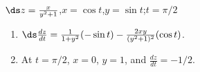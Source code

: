 {$\ds z=\frac{x}{y^2+1}$,\qquad $x=\cos t$,\qquad $y=\sin t$;\qquad $t=\pi/2$}
{\begin{enumerate}
	\item $\ds\frac{dz}{dt} = \frac{1}{1+y^2}(-\sin t)-\frac{2xy}{(y^2+1)^2}(\cos t)$.
	\item At $t=\pi/2$, $x=0$, $y=1$, and $\frac{dz}{dt} = -1/2$.
\end{enumerate}}
